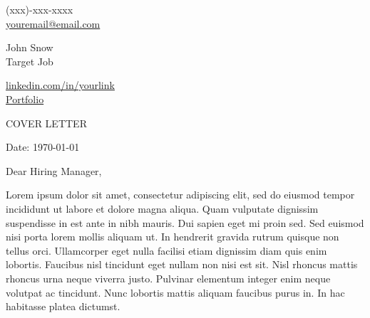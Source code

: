 \documentclass[11pt,a4]{article}
\begin{document}
\begin{center}
    \begin{minipage}[b]{0.24\textwidth}
            \large (xxx)-xxx-xxxx \\
            \large \href{mailto:youremail@email.com}{youremail@email.com} 
    \end{minipage}%
    \begin{minipage}[b]{0.5\textwidth}
            \centering
            {\Huge John Snow} \\ %
            \vspace{0.1cm}
            {\color{UI_blue} \Large{Target Job}} \\
    \end{minipage}%
    \begin{minipage}[b]{0.24\textwidth}
            \flushright \large
            {\href{https://www.linkedin.com/in/link/}{linkedin.com/in/yourlink} } \\
            \href{https://Add_your_portfolio_here_}{Portfolio}
    \end{minipage}   
    
\vspace{-0.15cm} 
{\color{UI_blue} \hrulefill}
\end{center}

\justify
\setlength{\parindent}{0pt}
\setlength{\parskip}{12pt}
\vspace{0.2cm}
\begin{center}
    {\color{UI_blue} \Large{COVER LETTER}}
\end{center}



Date: \today \par \vspace{-0.1cm}
Dear Hiring Manager, %

Lorem ipsum dolor sit amet, consectetur adipiscing elit, sed do eiusmod tempor incididunt ut labore et dolore magna aliqua. Quam vulputate dignissim suspendisse in est ante in nibh mauris. Dui sapien eget mi proin sed. Sed euismod nisi porta lorem mollis aliquam ut. In hendrerit gravida rutrum quisque non tellus orci. Ullamcorper eget nulla facilisi etiam dignissim diam quis enim lobortis. Faucibus nisl tincidunt eget nullam non nisi est sit. Nisl rhoncus mattis rhoncus urna neque viverra justo. Pulvinar elementum integer enim neque volutpat ac tincidunt. Nunc lobortis mattis aliquam faucibus purus in. In hac habitasse platea dictumst. \par
\end{document}
